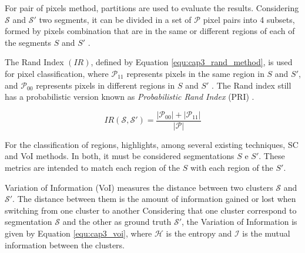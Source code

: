 For pair of pixels method, partitions are used to evaluate the results.
Considering $\mathcal{S}$ and $\mathcal{S'}$ two segments, it can be divided in a set of $\mathcal{P}$ pixel pairs into 4 subsets, formed by pixels combination that are in the same or different regions of each of the segments $S$ and $S'$ \cite{Meila:2005} \cite{Pont-Tuset2016a}.

The Rand Index \cite{Rand:1971} $(IR)$, defined by Equation \ref{equ:cap3_rand_method}, is used for pixel classification, where $\mathcal{P}_{11}$ represents pixels in the same region in $S$ and $S'$, and $\mathcal{P}_{00}$ represents pixels in different regions in $S$ and $S'$ \cite{Pont-Tuset2016a}.
The Rand index still has a probabilistic version known as \textit{Probabilistic Rand Index} (PRI) \cite{Milena:2019}.

\begin{equation}
 IR\mathcal{(S,S')} = \frac{|\mathcal{P}_{00}| + |\mathcal{P}_{11}|}{|\mathcal{P}|}
 \label{equ:cap3_rand_method}
\end{equation}


For the classification of regions, highlights, among several existing techniques, \ac{SC} \cite{amfm_pami2011} and \ac{VoI} \cite{Meila:2003} methods.
In both, it must be considered segmentations $S$ e $S'$. 
These metrics are intended to match each region of the $S$ with each region of the $S'$.

Variation of Information (\ac{VoI}) measures the distance between two clusters $\mathcal{S}$ and $\mathcal{S'}$.
The distance between them is the amount of information gained or lost when switching from one cluster to another \cite{Milena:2019} \cite{Meila:2005}
Considering that one cluster correspond to segmentation $\mathcal{S}$ and the other as ground truth $\mathcal{S'}$, the Variation of Information is given by Equation \ref{equ:cap3_voi}, where $\mathcal{H}$ is the entropy and $\mathcal{I}$ is the mutual information between the clusters.

